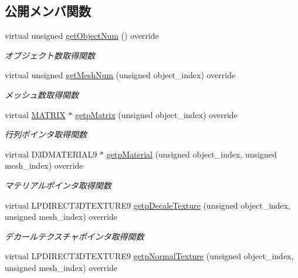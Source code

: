 \subsection*{公開メンバ関数}
\begin{DoxyCompactItemize}
\item 
virtual unsigned \mbox{\hyperlink{class_draw_null_a8bddfa6ee87e47b2ecbbe6803b088e37}{get\+Object\+Num}} () override
\begin{DoxyCompactList}\small\item\em オブジェクト数取得関数 \end{DoxyCompactList}\item 
virtual unsigned \mbox{\hyperlink{class_draw_null_a4c566a37d27fac3dcf76c7970443f375}{get\+Mesh\+Num}} (unsigned object\+\_\+index) override
\begin{DoxyCompactList}\small\item\em メッシュ数取得関数 \end{DoxyCompactList}\item 
virtual \mbox{\hyperlink{_vector3_d_8h_a032295cd9fb1b711757c90667278e744}{M\+A\+T\+R\+IX}} $\ast$ \mbox{\hyperlink{class_draw_null_a9aac059eb3b5d1f77e8bd3aa0647cff9}{getp\+Matrix}} (unsigned object\+\_\+index) override
\begin{DoxyCompactList}\small\item\em 行列ポインタ取得関数 \end{DoxyCompactList}\item 
virtual D3\+D\+M\+A\+T\+E\+R\+I\+A\+L9 $\ast$ \mbox{\hyperlink{class_draw_null_a0c1efe55fea325ad277594be6fe1e938}{getp\+Material}} (unsigned object\+\_\+index, unsigned mesh\+\_\+index) override
\begin{DoxyCompactList}\small\item\em マテリアルポインタ取得関数 \end{DoxyCompactList}\item 
virtual L\+P\+D\+I\+R\+E\+C\+T3\+D\+T\+E\+X\+T\+U\+R\+E9 \mbox{\hyperlink{class_draw_null_a87d21f70b6fed637a6e23029f29818c1}{getp\+Decale\+Texture}} (unsigned object\+\_\+index, unsigned mesh\+\_\+index) override
\begin{DoxyCompactList}\small\item\em デカールテクスチャポインタ取得関数 \end{DoxyCompactList}\item 
virtual L\+P\+D\+I\+R\+E\+C\+T3\+D\+T\+E\+X\+T\+U\+R\+E9 \mbox{\hyperlink{class_draw_null_abdb03713b973fd1f65c914fa146414a1}{getp\+Normal\+Texture}} (unsigned object\+\_\+index, unsigned mesh\+\_\+index) override

\end{DoxyCompactItemize}
